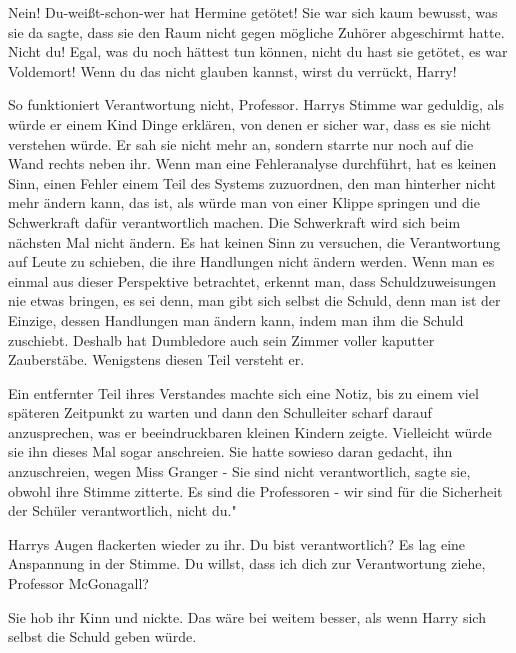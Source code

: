 \glqq Nein! Du-weißt-schon-wer hat Hermine getötet!\grqq{} Sie war sich kaum
bewusst, was sie da sagte, dass sie den Raum nicht gegen mögliche Zuhörer
abgeschirmt hatte. \glqq Nicht du! Egal, was du noch hättest tun können, nicht
du hast sie getötet, es war Voldemort! Wenn du das nicht glauben kannst, wirst
du verrückt, Harry!\grqq{}

\glqq So funktioniert Verantwortung nicht, Professor.\grqq{} Harrys Stimme war
geduldig, als würde er einem Kind Dinge erklären, von denen er sicher war, dass
es sie nicht verstehen würde. Er sah sie nicht mehr an, sondern starrte nur noch
auf die Wand rechts neben ihr. \glqq Wenn man eine Fehleranalyse durchführt, hat
es keinen Sinn, einen Fehler einem Teil des Systems zuzuordnen, den man
hinterher nicht mehr ändern kann, das ist, als würde man von einer Klippe
springen und die Schwerkraft dafür verantwortlich machen. Die Schwerkraft wird
sich beim nächsten Mal nicht ändern. Es hat keinen Sinn zu versuchen, die
Verantwortung auf Leute zu schieben, die ihre Handlungen nicht ändern werden.
Wenn man es einmal aus dieser Perspektive betrachtet, erkennt man, dass
Schuldzuweisungen nie etwas bringen, es sei denn, man gibt sich selbst die
Schuld, denn man ist der Einzige, dessen Handlungen man ändern kann, indem man
ihm die Schuld zuschiebt. Deshalb hat Dumbledore auch sein Zimmer voller
kaputter Zauberstäbe. Wenigstens diesen Teil versteht er.\grqq{}

Ein entfernter Teil ihres Verstandes machte sich eine Notiz, bis zu einem viel
späteren Zeitpunkt zu warten und dann den Schulleiter scharf darauf
anzusprechen, was er beeindruckbaren kleinen Kindern zeigte. Vielleicht würde
sie ihn dieses Mal sogar anschreien. Sie hatte sowieso daran gedacht, ihn
anzuschreien, wegen Miss Granger - \glqq Sie sind nicht verantwortlich\grqq{},
sagte sie, obwohl ihre Stimme zitterte. \glqq Es sind die Professoren - wir sind
für die Sicherheit der Schüler verantwortlich, nicht du."

Harrys Augen flackerten wieder zu ihr. \glqq Du bist verantwortlich?\grqq{} Es
lag eine Anspannung in der Stimme. \glqq Du willst, dass ich dich zur
Verantwortung ziehe, Professor McGonagall?\grqq{}

Sie hob ihr Kinn und nickte. Das wäre bei weitem besser, als wenn Harry sich
selbst die Schuld geben würde.

